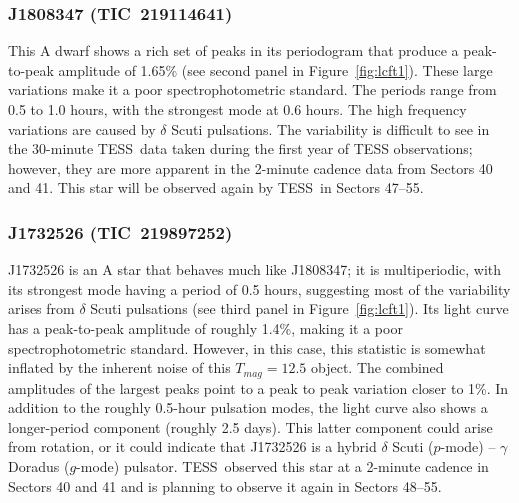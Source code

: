\documentclass[twocolumn]{aastex631}
\newcommand{\webb}{JWST}
\newcommand{\tess}{TESS}
\begin{document}

\subsubsection{J1808347 (TIC~219114641)}

This A dwarf shows a rich set of peaks in its periodogram that produce a peak-to-peak amplitude of 1.65\% (see second panel in Figure~\ref{fig:lcft1}). These large variations  make it a poor spectrophotometric standard. The periods range from 0.5 to 1.0 hours, with the strongest mode at 0.6 hours.  The high frequency variations are caused by $\delta$ Scuti pulsations.  The variability is difficult to see in the 30-minute \tess\ data taken during the first year of TESS observations; however, they are more apparent in the 2-minute cadence data from Sectors 40 and 41.  This star will be observed again by \tess\ in Sectors 47--55.  





\subsubsection{J1732526 (TIC~219897252)}

J1732526 is an A star that behaves much like J1808347; it is multiperiodic, with its strongest mode having a period of 0.5 hours, suggesting most of the variability arises from $\delta$ Scuti pulsations (see third panel in Figure~\ref{fig:lcft1}). Its light curve has a peak-to-peak amplitude of roughly 1.4\%, making it a poor spectrophotometric standard. However, in this case, this statistic is somewhat inflated by the inherent noise of this $T_{mag}=12.5$ object. The combined amplitudes of the largest peaks point to a peak to peak variation closer to 1\%.  In addition to the roughly 0.5-hour pulsation modes, the light curve also shows a longer-period component (roughly 2.5 days). This latter component could arise from rotation, or it could indicate that J1732526 is a hybrid $\delta$ Scuti ($p$-mode) -- $\gamma$ Doradus ($g$-mode) pulsator. \tess\ observed this star at a 2-minute cadence in Sectors 40 and 41 and is planning to observe it again in Sectors 48--55.
\end{document}
